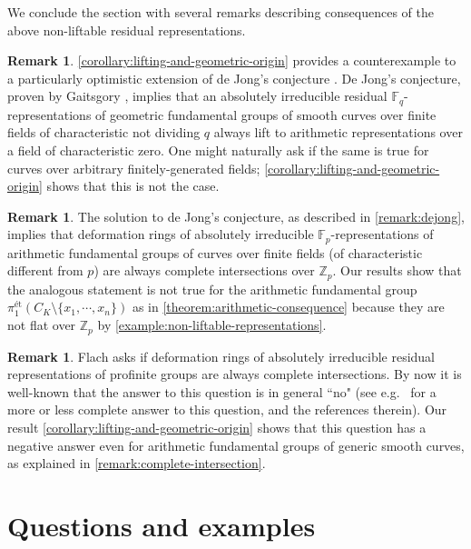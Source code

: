 \documentclass[12 pt]{amsart}
\theoremstyle{plain}
\theoremstyle{definition}
\newtheorem{remark}[subsubsection]{Remark}
\theoremstyle{remark}
\numberwithin{equation}{section}
\begin{document}
We conclude the section with several remarks describing consequences of the
above non-liftable residual representations.
\begin{remark}\label{remark:dejong}
\autoref{corollary:lifting-and-geometric-origin} provides a counterexample to a particularly optimistic extension of de Jong's conjecture \cite[Conjecture 2.3, Theorem 3.5]{de2001conjecture}.	De Jong's conjecture, proven by Gaitsgory \cite{gaitsgory2007jong}, implies that an absolutely irreducible residual $\mathbb{F}_q$-representations of geometric fundamental groups of smooth curves over finite fields of characteristic not dividing $q$ always lift to arithmetic representations over a field of characteristic zero. One might naturally ask if the same is true for curves over arbitrary finitely-generated fields; \autoref{corollary:lifting-and-geometric-origin} shows that this is not the case.
\end{remark}
\begin{remark}
	\label{remark:complete-intersection}
	The solution to de Jong's conjecture, as described in
	\autoref{remark:dejong}, implies that deformation rings of
absolutely irreducible $\mathbb{F}_p$-representations of arithmetic fundamental
groups of curves over finite fields (of characteristic different from $p$) are
always complete intersections over $\mathbb{Z}_p$. Our results show that the
analogous statement is not true for the arithmetic fundamental group
$\pi_1^{\text{\'et}}(C_{K}\setminus\{x_1, \cdots, x_n\})$ as in
\autoref{theorem:arithmetic-consequence} because they are not flat over $\mathbb
Z_p$ by \autoref{example:non-liftable-representations}. 
\end{remark}
\begin{remark}
	\label{remark:flach}
	Flach asks  \cite[p.~7]{cornelissen2005problems} if deformation rings of
	absolutely irreducible residual representations of profinite groups are
	always complete intersections. By now it is well-known that the answer
	to this question is in general ``no" (see e.g.~\cite{eardley2016inverse}
	for a more or less complete answer to this question, and the references
therein). Our result \autoref{corollary:lifting-and-geometric-origin} shows that
this question has a negative answer even for arithmetic fundamental groups of
generic smooth  curves, as explained in \autoref{remark:complete-intersection}.
\end{remark}






\section{Questions and examples}\label{section:questions}
\end{document}
